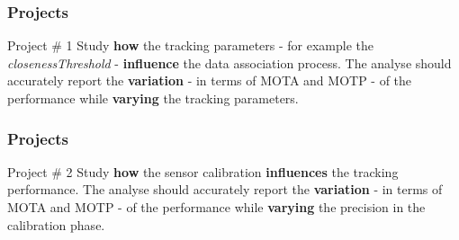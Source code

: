 \begin{frame}
	\frametitle{Projects}
	
	\LARGE
	
	\begin{block}{Project \# 1}
		Study \textbf{how} the tracking parameters - for example the \emph{closenessThreshold} -
		\textbf{influence} the data association process. The analyse should accurately report the
		\textbf{variation} - in terms of MOTA and MOTP - of the performance while \textbf{varying} the
		tracking parameters.
	\end{block}
\end{frame}

\begin{frame}
	\frametitle{Projects}
	
	\LARGE
	
	\begin{block}{Project \# 2}
		Study \textbf{how} the sensor calibration \textbf{influences} the tracking performance. The
		analyse should accurately report the \textbf{variation} - in terms of MOTA and MOTP - of the
		performance while \textbf{varying} the precision in the calibration phase.
	\end{block}
\end{frame}
